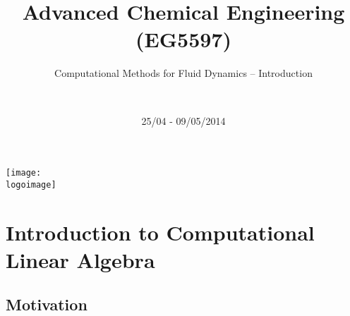 \documentclass[10pt,compress]{beamer}
\institute{School of Engineering}
\title{Advanced Chemical Engineering (EG5597)}
\subtitle{Computational Methods for Fluid Dynamics -- Introduction}
\date[25/04 - 09/05/2014]{25/04 - 09/05/2014}
\author[\shortname]{%
  \fullname\\\ttfamily{\emailaddress}
}
\newcommand{\logoimage}{./FigBanner/UoAHorizBanner}
\begin{document}
\begin{frame}
  \titlepage
  \vfill%
  \begin{center}
    \texttt{[image: \\logoimage]}
  \end{center}
\end{frame}




\section{Introduction to Computational Linear Algebra} 

\subsection{Motivation}
\end{document}

